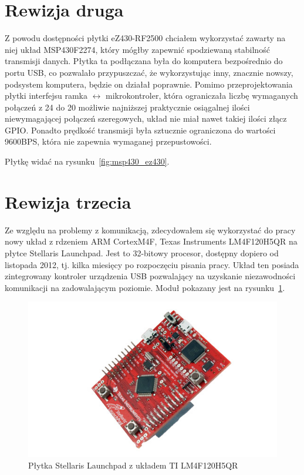 \section{Rewizja druga}

Z powodu dostępności płytki eZ430-RF2500 chciałem wykorzystać zawarty na niej układ MSP430F2274, który mógłby zapewnić spodziewaną stabilność transmisji danych.
Płytka ta podłączana była do komputera bezpośrednio do portu USB, co pozwalało przypuszczać, że wykorzystując inny, znacznie nowszy, podsystem komputera, będzie on działał poprawnie.
Pomimo przeprojektowania płytki interfejsu ramka $\leftrightarrow$ mikrokontroler, która ograniczała liczbę wymaganych połączeń z 24 do 20 \pauza możliwie najniższej praktycznie osiągalnej ilości niewymagającej połączeń szeregowych, układ nie miał nawet takiej ilości złącz GPIO.
Ponadto prędkość transmisji była sztucznie ograniczona do wartości 9600BPS, która nie zapewnia wymaganej przepustowości.

Płytkę widać na rysunku~\ref{fig:msp430_ez430}.\\

\section{Rewizja trzecia}

Ze względu na problemy z komunikacją, zdecydowałem się wykorzystać do pracy nowy układ z rdzeniem ARM Cortex\ppauza{}M4F, Texas Instruments LM4F120H5QR na płytce Stellaris Launchpad. Jest to 32-bitowy procesor, dostępny dopiero od listopada 2012, tj. kilka miesięcy po rozpoczęciu pisania pracy.
Układ ten posiada zintegrowany kontroler urządzenia USB pozwalający na uzyskanie niezawodności komunikacji na zadowalającym poziomie.
Moduł pokazany jest na rysunku~\ref{fig:stellaris_launchpad}.

\begin{figure}
 \centering
 \includegraphics[width=\textwidth]{gfx/stellaris_launchpad}
 \caption{Płytka Stellaris Launchpad z układem TI LM4F120H5QR}
 \label{fig:stellaris_launchpad}
\end{figure}

